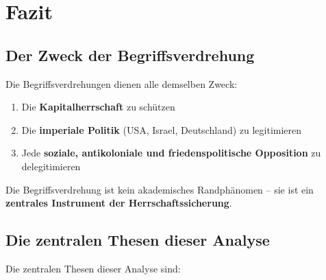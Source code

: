 \section{Fazit}

\subsection{Der Zweck der Begriffsverdrehung}

Die Begriffsverdrehungen dienen alle demselben Zweck:

\begin{enumerate}
    \item Die \textbf{Kapitalherrschaft} zu schützen
    \item Die \textbf{imperiale Politik} (USA, Israel, Deutschland) zu legitimieren
    \item Jede \textbf{soziale, antikoloniale und friedenspolitische Opposition} zu delegitimieren
\end{enumerate}

Die Begriffsverdrehung ist kein akademisches Randphänomen – sie ist ein \textbf{zentrales Instrument der Herrschaftssicherung}.

\subsection{Die zentralen Thesen dieser Analyse}

Die zentralen Thesen dieser Analyse sind:

